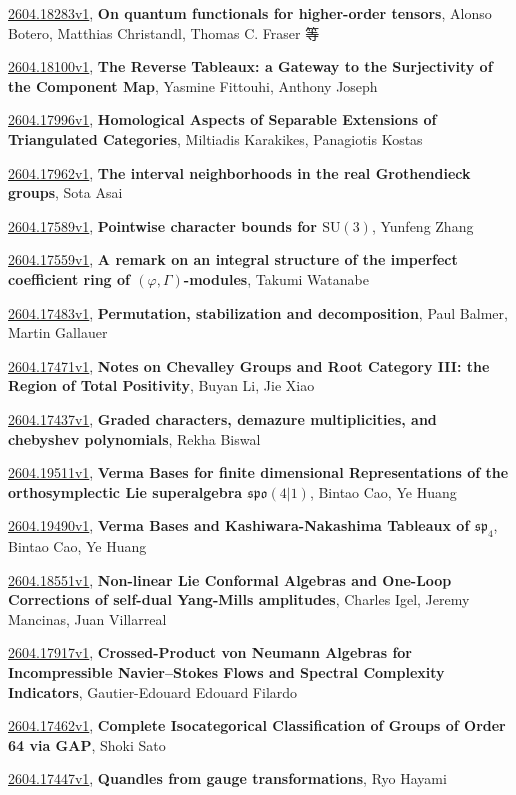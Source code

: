\documentclass[9pt, a4paper]{article}
\theoremstyle{plain}
\theoremstyle{definition}
\theoremstyle{remark}
\newcommand{\arxiv}[3]{\href{https://arxiv.org/abs/#1}{#1}, \textbf{\textcolor{arxivblue}{#2}}, #3}
\begin{document}
\arxiv{2604.18283v1}{On quantum functionals for higher-order tensors}{Alonso Botero, Matthias Christandl, Thomas C. Fraser 等}

\arxiv{2604.18100v1}{The Reverse Tableaux: a Gateway to the Surjectivity of the Component Map}{Yasmine Fittouhi, Anthony Joseph}

\arxiv{2604.17996v1}{Homological Aspects of Separable Extensions of Triangulated Categories}{Miltiadis Karakikes, Panagiotis Kostas}

\arxiv{2604.17962v1}{The interval neighborhoods in the real Grothendieck groups}{Sota Asai}

\arxiv{2604.17589v1}{Pointwise character bounds for $\mathrm{SU}(3)$}{Yunfeng Zhang}

\arxiv{2604.17559v1}{A remark on an integral structure of the imperfect coefficient ring of $(\varphi,Γ)$-modules}{Takumi Watanabe}

\arxiv{2604.17483v1}{Permutation, stabilization and decomposition}{Paul Balmer, Martin Gallauer}

\arxiv{2604.17471v1}{Notes on Chevalley Groups and Root Category III: the Region of Total Positivity}{Buyan Li, Jie Xiao}

\arxiv{2604.17437v1}{Graded characters, demazure multiplicities, and chebyshev polynomials}{Rekha Biswal}

\arxiv{2604.19511v1}{Verma Bases for finite dimensional Representations of the orthosymplectic Lie superalgebra $\mathfrak{spo}(4|1)$}{Bintao Cao, Ye Huang}

\arxiv{2604.19490v1}{Verma Bases and Kashiwara-Nakashima Tableaux of $\mathfrak{sp}_4$}{Bintao Cao, Ye Huang}

\arxiv{2604.18551v1}{Non-linear Lie Conformal Algebras and One-Loop Corrections of self-dual Yang-Mills amplitudes}{Charles Igel, Jeremy Mancinas, Juan Villarreal}

\arxiv{2604.17917v1}{Crossed-Product von Neumann Algebras for Incompressible Navier--Stokes Flows and Spectral Complexity Indicators}{Gautier-Edouard Edouard Filardo}

\arxiv{2604.17462v1}{Complete Isocategorical Classification of Groups of Order 64 via GAP}{Shoki Sato}

\arxiv{2604.17447v1}{Quandles from gauge transformations}{Ryo Hayami}

\end{document}
